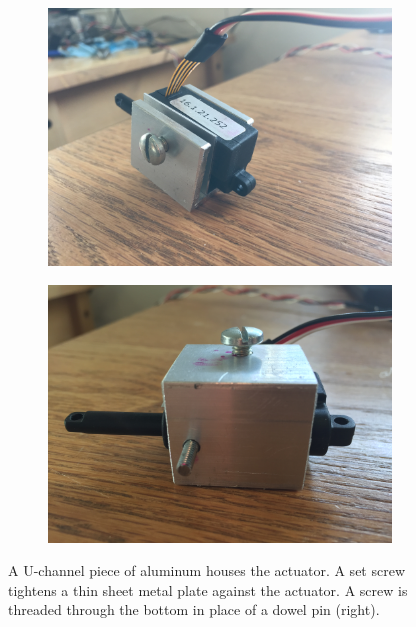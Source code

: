 \documentclass[letterpaper,12pt]{article}
\begin{document}
\begin{figure}[h]
\centering
\begin{subfigure}{.5\textwidth}
  \centering
  \includegraphics[width=0.9\linewidth]{actuator_mount.jpg}
\end{subfigure}%
\begin{subfigure}{.5\textwidth}
  \centering
  \includegraphics[width=0.9\linewidth]{actuator_mount_bottom.jpg}
\end{subfigure}
\caption{A U-channel piece of aluminum houses the actuator. A set screw tightens a thin sheet metal plate against the actuator. A screw is threaded through the bottom in place of a dowel pin (right).}
\label{fig:actuator}
\end{figure}
\end{document}
